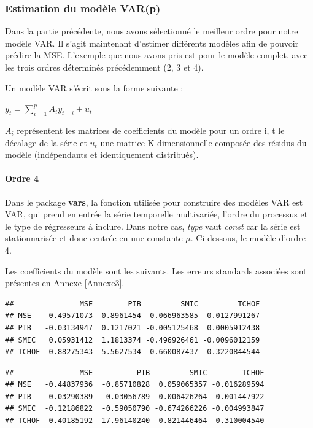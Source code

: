 \documentclass[11pt,]{article}
\let\oldparagraph\paragraph
\renewcommand{\paragraph}[1]{\oldparagraph{#1}\mbox{}}
\begin{document}
\subsubsection{Estimation du modèle
VAR(p)}\label{estimation-du-modele-varp}

Dans la partie précédente, nous avons sélectionné le meilleur ordre pour
notre modèle VAR. Il s'agit maintenant d'estimer différents modèles afin
de pouvoir prédire la MSE. L'exemple que nous avons pris est pour le
modèle complet, avec les trois ordres déterminés précédemment (2, 3 et
4).

Un modèle VAR s'écrit sous la forme suivante :

\(y_t = \sum_{i = 1}^{p} {A_iy_{t-i}} + u_t\)

\(A_i\) représentent les matrices de coefficients du modèle pour un
ordre i, t le décalage de la série et \(u_t\) une matrice
K-dimensionnelle composée des résidus du modèle (indépendants et
identiquement distribués).

\paragraph{Ordre 4}\label{ordre-4}

Dans le package \textbf{vars}, la fonction utilisée pour construire des
modèles VAR est VAR, qui prend en entrée la série temporelle
multivariée, l'ordre du processus et le type de régresseurs à inclure.
Dans notre cas, \emph{type} vaut \emph{const} car la série est
stationnarisée et donc centrée en une constante \(\mu\). Ci-dessous, le
modèle d'ordre 4.

Les coefficients du modèle sont les suivants. Les erreurs standards
associées sont présentes en Annexe \ref{Annexe3}.

\begin{verbatim}
##               MSE        PIB         SMIC         TCHOF
## MSE   -0.49571073  0.8961454  0.066963585 -0.0127991267
## PIB   -0.03134947  0.1217021 -0.005125468  0.0005912438
## SMIC   0.05931412  1.1813374 -0.496926461 -0.0096012159
## TCHOF -0.88275343 -5.5627534  0.660087437 -0.3220844544
\end{verbatim}

\begin{verbatim}
##               MSE          PIB         SMIC        TCHOF
## MSE   -0.44837936  -0.85710828  0.059065357 -0.016289594
## PIB   -0.03290389  -0.03056789 -0.006426264 -0.001447922
## SMIC  -0.12186822  -0.59050790 -0.674266226 -0.004993847
## TCHOF  0.40185192 -17.96140240  0.821446464 -0.310004540
\end{verbatim}
\end{document}
